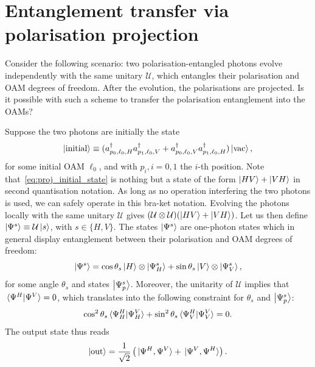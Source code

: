 \documentclass[
	aps, pra, authorblock, superscriptaddress, twocolumn,
	10pt
]{revtex4-1}
\newcommand{\on}[1]{\operatorname{#1}}
\newcommand{\U}{\mathcal{U}}
\begin{document}

\section{Entanglement transfer via polarisation projection}
Consider the following scenario: two polarisation-entangled photons evolve independently with the same unitary $\mathcal U$, which entangles their polarisation and OAM degrees of freedom. After the evolution, the polarisations are projected. Is it possible with such a scheme to transfer the polarisation entanglement into the OAMs?

Suppose the two photons are initially the state
\begin{equation}
    \ket{\on{initial}}\equiv
    (a_{p_0,\ell_0,H}^\dagger
    a_{p_1,\ell_0,V}^\dagger +
    a_{p_0,\ell_0,V}^\dagger
    a_{p_1,\ell_0,H}^\dagger) \ket{\mathrm{vac}},
    \label{eq:proj_initial_state}
\end{equation}
for some initial OAM $\ell_0$, and with $p_i, i=0,1$ the $i$-th position.
Note that~\cref{eq:proj_initial_state} is nothing but a state of the form $\ket{HV}+\ket{VH}$ in second quantisation notation.
As long as no operation interfering the two photons is used, we can safely operate in this bra-ket notation.
Evolving the photons locally with the same unitary $\U$ gives
$(\U\otimes\U)(\ket{HV}+\ket{VH})$.
Let us then define
$\ket{\Psi^s}\equiv\U\ket s$, with $s\in\{H,V\}$.
The states $\ket{\Psi^s}$ are one-photon states which in general display entanglement between their polarisation and OAM degrees of freedom:
\begin{equation}
    \ket{\Psi^s}=
    \cos\theta_s \ket H\otimes\ket{\Psi^s_{H}} +
    \sin\theta_s \ket V\otimes\ket{\Psi^s_{V}},
\end{equation}
for some angle $\theta_s$ and states $\ket{\Psi^s_p}$.
Moreover, the unitarity of $\U$ implies that $\braket*{\Psi^H}{\Psi^V}=0$, which translates into the following constraint for $\theta_s$ and $\ket{\Psi^s_p}$:
\begin{equation}
    \cos^2\theta_s\braket*{\Psi^H_H}{\Psi^V_H} +
    \sin^2\theta_s\braket*{\Psi^H_V}{\Psi^V_V} = 0.
\end{equation}
The output state thus reads
\begin{equation}
    \ket{\on{out}}
    = \frac{1}{\sqrt2}\left(
    \ket*{\Psi^H,\Psi^V} + \ket*{\Psi^V,\Psi^H}
    \right).
    \label{eq:proj_output_state}
\end{equation}
\end{document}
